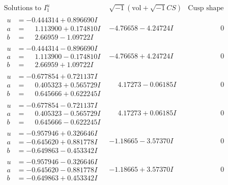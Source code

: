 \documentclass[1p]{elsarticle_modified}
\theoremstyle{definition}
\newcommand{\I}{\sqrt{-1}}
\begin{document}
$$\begin{array}{c|c|c}  
\text{Solutions to }I^u_{1}& \I (\text{vol} + \sqrt{-1}CS) & \text{Cusp shape}\\
 \hline 
\begin{aligned}
u &= -0.444314 + 0.896690 I \\
a &= \phantom{-}1.113900 + 0.174810 I \\
b &= \phantom{-}2.66959 - 1.09722 I\end{aligned}
 & -4.76658 - 4.24724 I & \phantom{-0.000000 } 0 \\ \hline\begin{aligned}
u &= -0.444314 - 0.896690 I \\
a &= \phantom{-}1.113900 - 0.174810 I \\
b &= \phantom{-}2.66959 + 1.09722 I\end{aligned}
 & -4.76658 + 4.24724 I & \phantom{-0.000000 } 0 \\ \hline\begin{aligned}
u &= -0.677854 + 0.721137 I \\
a &= \phantom{-}0.405323 + 0.565729 I \\
b &= \phantom{-}0.645666 + 0.622245 I\end{aligned}
 & \phantom{-}4.17273 - 0.06185 I & \phantom{-0.000000 } 0 \\ \hline\begin{aligned}
u &= -0.677854 - 0.721137 I \\
a &= \phantom{-}0.405323 - 0.565729 I \\
b &= \phantom{-}0.645666 - 0.622245 I\end{aligned}
 & \phantom{-}4.17273 + 0.06185 I & \phantom{-0.000000 } 0 \\ \hline\begin{aligned}
u &= -0.957946 + 0.326646 I \\
a &= -0.645620 + 0.881778 I \\
b &= -0.649863 - 0.453342 I\end{aligned}
 & -1.18665 - 3.57370 I & \phantom{-0.000000 } 0 \\ \hline\begin{aligned}
u &= -0.957946 - 0.326646 I \\
a &= -0.645620 - 0.881778 I \\
b &= -0.649863 + 0.453342 I\end{aligned}
 & -1.18665 + 3.57370 I & \phantom{-0.000000 } 0 \\ \hline\begin{aligned}

\end{aligned}
\end{array}$$
\end{document}
